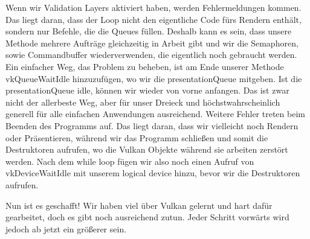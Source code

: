 \documentclass[11pt,a4paper]{report}
\begin{document}
Wenn wir Validation Layers aktiviert haben, werden Fehlermeldungen kommen. Das liegt daran, dass der Loop nicht den eigentliche Code fürs Rendern enthält, sondern nur Befehle, die die Queues füllen. Deshalb kann es sein, dass unsere Methode mehrere Aufträge gleichzeitig in Arbeit gibt und wir die Semaphoren, sowie Commandbuffer wiederverwenden, die eigentlich noch gebraucht werden. Ein einfacher Weg, das Problem zu beheben, ist am Ende unserer Methode vkQueueWaitIdle hinzuzufügen, wo wir die presentationQueue mitgeben. Ist die presentationQueue idle, können wir wieder von vorne anfangen. Das ist zwar nicht der allerbeste Weg, aber für unser Dreieck und höchstwahrscheinlich generell für alle einfachen Anwendungen ausreichend. Weitere Fehler treten beim Beenden des Programms auf. Das liegt daran, dass wir vielleicht noch Rendern oder Präsentieren, während wir das Programm schließen und somit die Destruktoren aufrufen, wo die Vulkan Objekte während sie arbeiten zerstört werden. Nach dem while loop fügen wir also noch einen Aufruf von vkDeviceWaitIdle mit unserem logical device hinzu, bevor wir die Destruktoren aufrufen.

Nun ist es geschafft! Wir haben viel über Vulkan gelernt und hart dafür gearbeitet, doch es gibt noch ausreichend zutun. Jeder Schritt vorwärts wird jedoch ab jetzt ein größerer sein.
\end{document}
